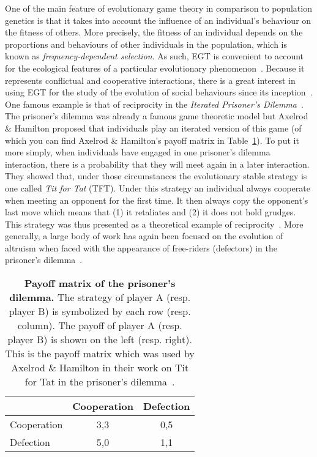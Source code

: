             One of the main feature of evolutionary game theory in comparison to population genetics is that it takes into account the influence of an individual's behaviour on the fitness of others. More precisely, the fitness of an individual depends on the proportions and behaviours of other individuals in the population, which is known as \emph{frequency-dependent selection}. As such, EGT is convenient to account for the ecological features of a particular evolutionary phenomenon~\parencite{Hammerstein1994}. Because it represents conflictual and cooperative interactions, there is a great interest in using EGT for the study of the evolution of social behaviours since its inception~\parencite{Bshary2015}. One famous example is that of reciprocity in the \emph{Iterated Prisoner's Dilemma}~\parencite{Axelrod1984}. The prisoner's dilemma was already a famous game theoretic model but Axelrod \& Hamilton proposed that individuals play an iterated version of this game (of which you can find Axelrod \& Hamilton's payoff matrix in Table~\ref{table:payoffIPD}). To put it more simply, when individuals have engaged in one prisoner's dilemma interaction, there is a probability that they will meet again in a later interaction. They showed that, under those circumstances the evolutionary stable strategy is one called \emph{Tit for Tat} (TFT). Under this strategy an individual always cooperate when meeting an opponent for the first time. It then always copy the opponent's last move which means that (1) it retaliates and (2) it does not hold grudges. This strategy was thus presented as a theoretical example of reciprocity~\parencite{Trivers1971}. More generally, a large body of work has again been focused on the evolution of altruism when faced with the appearance of free-riders (defectors) in the prisoner's dilemma~\parencite{Requejo2013a}.


            \begin{table}[ht]
            \centering
              \begin{tabular}{l|c|c}
                & Cooperation & Defection \\
                \hline
                Cooperation & 3,3 & 0,5 \\
                \hline
                Defection & 5,0 & 1,1 \\
                \hline
              \end{tabular}
              \caption{\textbf{Payoff matrix of the prisoner's dilemma.}
              The strategy of player A (resp. player B) is symbolized by each row (resp. column). The payoff of player A (resp. player B) is shown on the left (resp. right). This is the payoff matrix which was used by Axelrod \& Hamilton in their work on Tit for Tat in the prisoner's dilemma~\parencite{Axelrod1984}.}
            \label{table:payoffIPD}
            \end{table}


